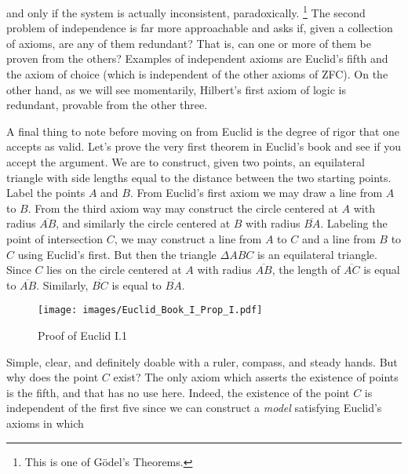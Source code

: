         and only if the system is actually inconsistent, paradoxically.%
        \footnote{%
            This is one of G\"{o}del's Theorems.
        }
        The second problem of independence is far more approachable and asks if,
        given a collection of axioms, are any of them redundant? That is, can
        one or more of them be proven from the others? Examples of independent
        axioms are Euclid's fifth and the axiom of choice (which is independent
        of the other axioms of ZFC). On the other hand, as we will see
        momentarily, Hilbert's first axiom of logic is redundant, provable from
        the other three.
        \par\hfill\par
        A final thing to note before moving on from Euclid is the degree of
        rigor that one accepts as valid. Let's prove the very first theorem in
        Euclid's book and see if you accept the argument. We are to construct,
        given two points, an equilateral triangle with side lengths equal to
        the distance between the two starting points. Label the points $A$ and
        $B$. From Euclid's first axiom we may draw a line from $A$ to $B$. From
        the third axiom way may construct the circle centered at $A$ with radius
        $\overline{AB}$, and similarly the circle centered at $B$ with radius
        $\overline{BA}$. Labeling the point of intersection $C$, we may
        construct a line from $A$ to $C$ and a line from $B$ to $C$ using
        Euclid's first. But then the triangle $\Delta{ABC}$ is an equilateral
        triangle. Since $C$ lies on the circle centered at $A$ with radius
        $\overline{AB}$, the length of $\overline{AC}$ is equal to
        $\overline{AB}$. Similarly, $\overline{BC}$ is equal to $\overline{BA}$.
        \par\hfill\par
        \begin{figure}
            \centering
            \captionsetup{type=figure}
            \texttt{[image: images/Euclid\_Book\_I\_Prop\_I.pdf]}
            \caption{Proof of Euclid I.1}
            \label{fig:Euclid_I_1}
        \end{figure}
        Simple, clear, and definitely doable with a ruler, compass, and steady
        hands. But why does the point $C$ exist? The only axiom which asserts
        the existence of points is the fifth, and that has no use here. Indeed,
        the existence of the point $C$ is independent of the first five since
        we can construct a \textit{model} satisfying Euclid's axioms in which

